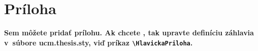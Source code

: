 \chapter*{Príloha}

{\bf Sem môžete pridať prílohu. Ak chcete , tak upravte definíciu
  záhlavia v~súbore ucm.thesis.sty, viď príkaz \verb+\HlavickaPriloha+.}
\medskip

